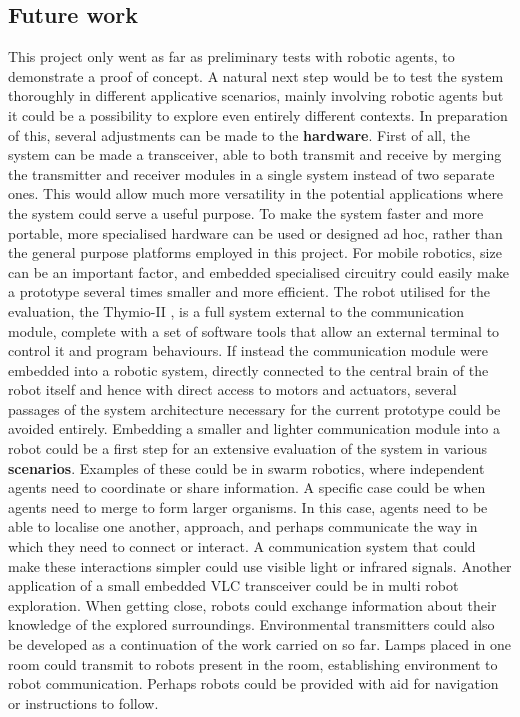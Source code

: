 \subsection{Future work}
This project only went as far as preliminary tests with robotic agents, to demonstrate a proof of concept.
A natural next step would be to test the system thoroughly in different applicative scenarios, mainly involving robotic agents but it could be a possibility to explore even entirely different contexts.
In preparation of this, several adjustments can be made to the \textbf{hardware}.
First of all, the system can be made a transceiver, able to both transmit and receive by merging the transmitter and receiver modules in a single system instead of two separate ones.
This would allow much more versatility in the potential applications where the system could serve a useful purpose.
To make the system faster and more portable, more specialised hardware can be used or designed ad hoc, rather than the general purpose platforms employed in this project.
For mobile robotics, size can be an important factor, and embedded specialised circuitry could easily make a prototype several times smaller and more efficient.
The robot utilised for the evaluation, the Thymio-II \cite{thymio}, is a full system external to the communication module, complete with a set of software tools that allow an external terminal to control it and program behaviours.
If instead the communication module were embedded into a robotic system, directly connected to the central brain of the robot itself and hence with direct access to motors and actuators, several passages of the system architecture necessary for the current prototype could be avoided entirely.
Embedding a smaller and lighter communication module into a robot could be a first step for an extensive evaluation of the system in various \textbf{scenarios}.
Examples of these could be in swarm robotics, where independent agents need to coordinate or share information.
A specific case could be when agents need to merge to form larger organisms.
In this case, agents need to be able to localise one another, approach, and perhaps communicate the way in which they need to connect or interact.
A communication system that could make these interactions simpler could use visible light or infrared signals. 
Another application of a small embedded VLC transceiver could be in multi robot exploration.
When getting close, robots could exchange information about their knowledge of the explored surroundings.
Environmental transmitters could also be developed as a continuation of the work carried on so far.
Lamps placed in one room could transmit to robots present in the room, establishing environment to robot communication.
 Perhaps robots could be provided with aid for navigation or instructions to follow.